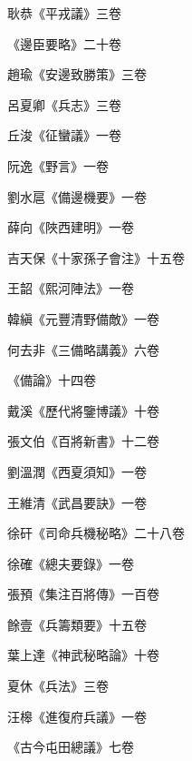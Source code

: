 \begin{pinyinscope}
 耿恭《平戎議》三卷



 《邊臣要略》二十卷



 趙瑜《安邊致勝策》三卷



 呂夏卿《兵志》三卷



 丘浚《征蠻議》一卷



 阮逸《野言》一卷



 劉水扈《備邊機要》一卷



 薛向《陜西建明》一卷



 吉天保《十家孫子會注》十五卷



 王韶《熙河陣法》一卷



 韓縝《元豐清野備敵》一卷



 何去非《三備略講義》六卷



 《備論》十四卷



 戴溪《歷代將鑒博議》十卷



 張文伯《百將新書》十二卷



 劉溫潤《西夏須知》一卷



 王維清《武昌要訣》一卷



 徐矸《司命兵機秘略》二十八卷



 徐確《總夫要錄》一卷



 張預《集注百將傳》一百卷



 餘壹《兵籌類要》十五卷



 葉上達《神武秘略論》十卷



 夏休《兵法》三卷



 汪槔《進復府兵議》一卷



 《古今屯田總議》七卷




\end{pinyinscope}
